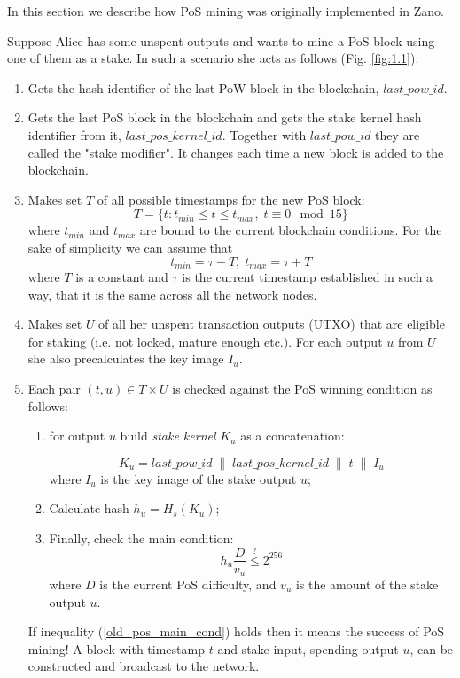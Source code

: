 \documentclass{article}
\numberwithin{figure}{section}
\begin{document}
\indent
In this section we describe how PoS mining was originally implemented in Zano.

\indent
Suppose Alice has some unspent outputs and wants to mine a PoS block using one of them as a stake. In such a scenario she acts as follows (Fig. \ref{fig:1.1}):

\begin{enumerate}
\item Gets the hash identifier of the last PoW block in the blockchain, $last\_pow\_id$.

\item Gets the last PoS block in the blockchain and gets the stake kernel hash identifier from it, $last\_pos\_kernel\_id$. Together with $last\_pow\_id$ they are called the "stake modifier". It changes each time a new block is added to the blockchain. 

\item Makes set $T$ of all possible timestamps for the new PoS block:
\[ T = \{t : t_{min} \leq t \leq t_{max}, \; t \equiv 0 \mod{15} \} \]
where $t_{min}$ and $t_{max}$ are bound to the current blockchain conditions. For the sake of simplicity we can assume that
\[ t_{min} = \tau - T, \; t_{max} = \tau + T \]
where $T$ is a constant and $\tau$ is the current timestamp established in such a way, that it is the same across all the network nodes.

\item Makes set $U$ of all her unspent transaction outputs (UTXO) that are eligible for staking (i.e. not locked, mature enough etc.). For each output $u$ from $U$ she also precalculates the key image $I_u$.

\item Each pair $(t, u) \in T \times U$ is checked against the PoS winning condition as follows:

    \begin{enumerate}
    \item for output $u$ build \textit{stake kernel} $K_u$ as a concatenation:

    \[ K_u = last\_pow\_id \;\|\; last\_pos\_kernel\_id \;\|\; t \;\|\; I_u \]
    where $I_u$ is the key image of the stake output $u$;
    
    \item Calculate hash $h_u = H_s(K_u)$;
    
    \item Finally, check the main condition:
    \begin{equation} \label{old_pos_main_cond}
    h_u \frac{D}{v_u} \stackrel{?}{\leq} 2^{256} \end{equation} 
    where $D$ is the current PoS difficulty, and $v_u$ is the amount of the stake output $u$. 
    
    \end{enumerate}
    
    If inequality (\ref{old_pos_main_cond}) holds then it means the success of PoS mining! A block with timestamp $t$ and stake input, spending output $u$, can be constructed and broadcast to the network.
    
\end{enumerate}
\end{document}
